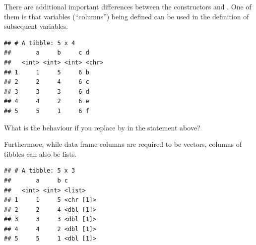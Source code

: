 \documentclass[krantz2,ChapterTOCs]{krantz}\usepackage{knitr}
\begin{document}
There are additional important differences between the constructors  and . One of them is that variables (``columns'')  being defined can be used in the definition of subsequent variables.

\begin{knitrout}\footnotesize
{}\color{fgcolor}\begin{kframe}
\begin{alltt}
\hlstd{(} \hlstd{=} \hlopt{:}\hlstd{,}  \hlstd{=} \hlopt{:}\hlstd{,}   \hlopt{+}   \hlstd{= letters[a} \hlopt{+} \hlstd{])}
\end{alltt}
\begin{verbatim}
## # A tibble: 5 x 4
##       a     b     c d    
##   <int> <int> <int> <chr>
## 1     1     5     6 b    
## 2     2     4     6 c    
## 3     3     3     6 d    
## 4     4     2     6 e    
## 5     5     1     6 f
\end{verbatim}
\end{kframe}
\end{knitrout}

\begin{playground}
What is the behaviour if you replace  by  in the statement above?
\end{playground}

Furthermore, while data frame columns are required to be vectors, columns of tibbles can also be lists.

\begin{knitrout}\footnotesize
{}\color{fgcolor}\begin{kframe}
\begin{alltt}
\hlstd{(} \hlstd{=} \hlopt{:}\hlstd{,}  \hlstd{=} \hlopt{:}\hlstd{,}  \hlstd{=} \hlstd{(}\hlstd{,} \hlstd{,} \hlstd{,} \hlstd{,} \hlstd{))}
\end{alltt}
\begin{verbatim}
## # A tibble: 5 x 3
##       a     b c        
##   <int> <int> <list>   
## 1     1     5 <chr [1]>
## 2     2     4 <dbl [1]>
## 3     3     3 <dbl [1]>
## 4     4     2 <dbl [1]>
## 5     5     1 <dbl [1]>
\end{verbatim}
\end{kframe}
\end{knitrout}
\end{document}
